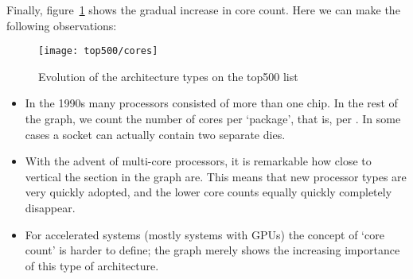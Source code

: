 Finally, figure~\ref{fig:top500-cores} shows the gradual increase in
core count. Here we can make the following observations:
\begin{figure}[ht]
  \texttt{[image: top500/cores]}
  \caption{Evolution of the architecture types on the top500 list}
  \label{fig:top500-cores}
\end{figure}
\begin{itemize}
\item In the 1990s many processors consisted of more than one chip.
  In the rest of the graph, we count the number of cores per
  `package', that is, per . In some cases a socket
  can actually contain two separate dies.
\item With the advent of multi-core processors, it is remarkable how
  close to vertical the section in the graph are. This means that new
  processor types are very quickly adopted, and the lower core counts
  equally quickly completely disappear.
\item For accelerated systems (mostly systems with \acp{GPU}) the
  concept of `core count' is harder to define; the graph merely shows
  the increasing importance of this type of architecture.
\end{itemize}
